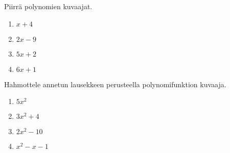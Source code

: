 \begin{tehtava}
    Piirrä polynomien kuvaajat.
    \begin{enumerate}
        \item $x+4$
        \item $2x-9$
        \item $5x+2$
        \item $6x+1$
    \end{enumerate}
    \begin{vastaus}
        \item \begin{kuvaajapohja}{0.4}{-4}{4}{-1}{7}
			  \end{kuvaajapohja}
    	\item \begin{kuvaajapohja}{0.4}{-2}{6}{-6}{2}
			  \end{kuvaajapohja}
		\item \begin{kuvaajapohja}{0.4}{-4}{4}{-2}{6}
			  \end{kuvaajapohja}
		\item \begin{kuvaajapohja}{0.4}{-4}{4}{-2}{6}
			  \end{kuvaajapohja}
    \end{vastaus}
\end{tehtava}

\begin{tehtava}
    Hahmottele annetun lausekkeen perusteella polynomifunktion kuvaaja.
    \begin{enumerate}
        \item $5x^2$
        \item $3x^2+4$
        \item $2x^2-10$
        \item $x^2-x-1$
    \end{enumerate}
    \begin{vastaus}
        \item \begin{kuvaajapohja}{0.4}{-4}{4}{-1}{7}
			  \end{kuvaajapohja}
    	\item \begin{kuvaajapohja}{0.4}{-4}{4}{-1}{11}
			  \end{kuvaajapohja}
		\item \begin{kuvaajapohja}{0.4}{-4}{4}{-11}{1}
			  \end{kuvaajapohja}
		\item \begin{kuvaajapohja}{0.4}{-3}{5}{-2}{6}
			  \end{kuvaajapohja}
    \end{vastaus}
\end{tehtava}

